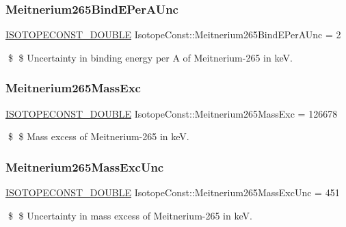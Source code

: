\subsubsection{\texorpdfstring{Meitnerium265\+Bind\+E\+Per\+A\+Unc}{Meitnerium265BindEPerAUnc}}
{\footnotesize\ttfamily \mbox{\hyperlink{group___isotope_const-_macros_ga8f45a7272ce02c0b4c65c44636ed719a}{I\+S\+O\+T\+O\+P\+E\+C\+O\+N\+S\+T\+\_\+\+D\+O\+U\+B\+LE}} Isotope\+Const\+::\+Meitnerium265\+Bind\+E\+Per\+A\+Unc = 2}

\$ \$ Uncertainty in binding energy per A of Meitnerium-\/265 in keV. \mbox{\label{group___isotope_const-_meitnerium-_mt265_gaca4c3543739598da4ee9c7c2557c6451}} 
\subsubsection{\texorpdfstring{Meitnerium265\+Mass\+Exc}{Meitnerium265MassExc}}
{\footnotesize\ttfamily \mbox{\hyperlink{group___isotope_const-_macros_ga8f45a7272ce02c0b4c65c44636ed719a}{I\+S\+O\+T\+O\+P\+E\+C\+O\+N\+S\+T\+\_\+\+D\+O\+U\+B\+LE}} Isotope\+Const\+::\+Meitnerium265\+Mass\+Exc = 126678}

\$ \$ Mass excess of Meitnerium-\/265 in keV. \mbox{\label{group___isotope_const-_meitnerium-_mt265_gad20ac161ce3ecd2c0c9724351bc0e7c0}} 
\subsubsection{\texorpdfstring{Meitnerium265\+Mass\+Exc\+Unc}{Meitnerium265MassExcUnc}}
{\footnotesize\ttfamily \mbox{\hyperlink{group___isotope_const-_macros_ga8f45a7272ce02c0b4c65c44636ed719a}{I\+S\+O\+T\+O\+P\+E\+C\+O\+N\+S\+T\+\_\+\+D\+O\+U\+B\+LE}} Isotope\+Const\+::\+Meitnerium265\+Mass\+Exc\+Unc = 451}

\$ \$ Uncertainty in mass excess of Meitnerium-\/265 in keV. \mbox{\label{group___isotope_const-_meitnerium-_mt265_ga33427192340aa4fec23f62cf127b57e9}} 
